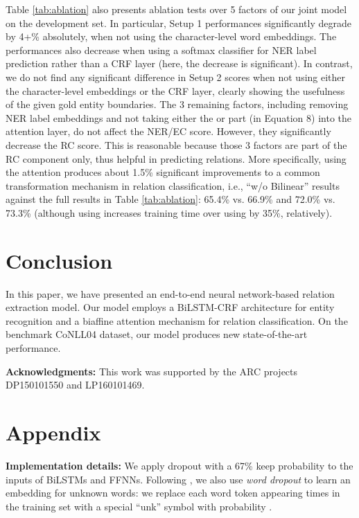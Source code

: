 \documentclass[runningheads]{llncs}
\begin{document}
Table \ref{tab:ablation} also presents ablation tests over 5  factors of our joint  model on the development set. In particular,  Setup 1 performances significantly degrade by 4+\% absolutely, when not using the character-level word embeddings. The performances also decrease when using a softmax classifier for NER label prediction rather than a CRF layer (here, the decrease is  significant). In contrast, we do not find any significant difference in Setup 2 scores when not using either the character-level  embeddings or the CRF layer, clearly showing the usefulness of the given gold  entity boundaries. 
The 3 remaining  factors, including removing NER label embeddings and  not taking either the  or   part (in Equation 8) into the  attention layer,   do not  affect the NER/EC score. However, they significantly decrease the RC score. This  is reasonable because those 3 factors are part of the RC component only, thus  helpful in predicting relations. 
More specifically, using the  attention produces about 1.5\%  significant improvements to a common  transformation mechanism in relation classification, i.e., ``w/o Bilinear'' results  against the full results in Table \ref{tab:ablation}: 65.4\% vs. 66.9\%  and 72.0\%   vs. 73.3\% (although using  increases training time over using  by 35\%, relatively). 

\section{Conclusion}

In this paper, we have presented an end-to-end neural network-based relation extraction model.  Our model employs a BiLSTM-CRF architecture for entity recognition and a biaffine attention mechanism for relation classification. On the benchmark CoNLL04 dataset, our model produces new  state-of-the-art performance. 


\medskip

\noindent \textbf{Acknowledgments:} 
This work was supported by the ARC projects DP150101550 and  LP160101469. 







\section*{Appendix}

\noindent\textbf{Implementation details:} 
We  apply dropout \cite{JMLR:v15:srivastava14a} with a 67\% keep probability to the inputs of  BiLSTMs and FFNNs. Following  \cite{TACL885},  we also use \textit{word dropout} to learn  an embedding for unknown words: we replace each word token  appearing  times in the training set  with a special ``unk'' symbol with probability . 
\end{document}
